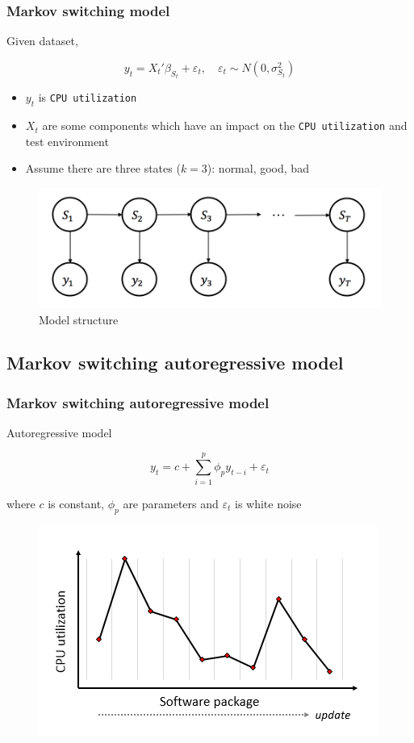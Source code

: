 \documentclass{beamer}
\begin{document}
\begin{frame}
\frametitle{Markov switching model}

Given dataset,

$$y_{t} = {X_{t}}'\beta_{S_{t}} + \varepsilon_{t}, \quad \varepsilon_{t} \sim N(0,\sigma^{2}_{S_{t}})$$

\begin{itemize}
	\item $y_{t}$ is \texttt{CPU utilization}
	\item$X_{t}$ are some components which have an impact on the \texttt{CPU utilization} and test environment
	\item Assume there are three states ($k=3$): normal, good, bad
\end{itemize}

\begin{figure}
	\includegraphics[width=0.5\linewidth]{msm}
	\caption{Model structure}
\end{figure}

\end{frame}

\subsection{Markov switching autoregressive model} %

\begin{frame}
\frametitle{Markov switching autoregressive model}

Autoregressive model

$$y_{t} = c + \sum_{i=1}^{p}\phi_{p}y_{t-i} + \varepsilon_{t}$$

where $c$ is constant, $\phi_{p}$ are parameters and $\varepsilon_{t}$ is white noise

\begin{figure}
	\includegraphics[width=0.6\linewidth]{inde}
\end{figure}
\end{frame}
\end{document}
